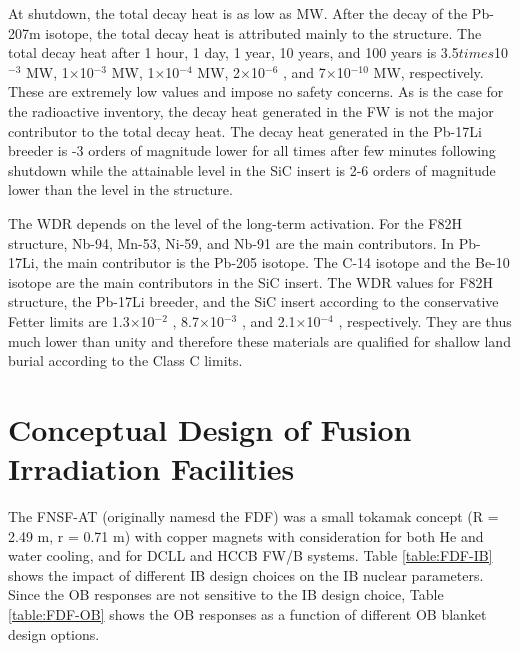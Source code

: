 At shutdown, the total decay heat is as low as  MW. After the
decay of the Pb-207m isotope, the total decay heat is attributed mainly to the
structure. The total decay heat after 1 hour, 1 day, 1 year, 10 years, and 100
years is 3.5$times$10$^{-3}$ MW, 1$\times$10$^{-3}$ MW, 1$\times$10$^{-4}$ MW,
2$\times$10$^{-6}$ , and 7$\times$10$^{-10}$ MW, respectively. These are
extremely low values and impose no safety concerns. As is the case for the
radioactive inventory, the decay heat generated in the \gls{FW} is not the
major contributor to the total decay heat. The decay heat generated in the
Pb-17Li breeder is -3 orders of magnitude lower for all times
after few minutes following shutdown while the attainable level in the SiC
insert is 2-6 orders of magnitude lower than the level in the structure.

The \gls{WDR} depends on the level of the long-term activation. For the F82H
structure, Nb-94, Mn-53, Ni-59, and Nb-91 are the main contributors. In Pb-
17Li, the main contributor is the Pb-205 isotope. The C-14 isotope and the
Be-10 isotope are the main contributors in the SiC insert. The \gls{WDR}
values for F82H structure, the Pb-17Li breeder, and the SiC insert according
to the conservative Fetter limits are 1.3$\times$10$^{-2}$ ,
8.7$\times$10$^{-3}$ , and 2.1$\times$10$^{-4}$ , respectively. They are thus
much lower than unity and therefore these materials are qualified for shallow
land burial according to the Class C limits.


\section{Conceptual Design of Fusion Irradiation Facilities}

The \gls{FNSF-AT} (originally namesd the \gls{FDF}) was a small tokamak
concept (R = 2.49 m, r = 0.71 m) with copper magnets with consideration for
both He and water cooling, and for \gls{DCLL} and \gls{HCCB} \gls{FW/B}
systems.  Table \ref{table:FDF-IB} shows the impact of different \gls{IB}
design choices on the \gls{IB} nuclear parameters.  Since the \gls{OB}
responses are not sensitive to the \gls{IB} design choice, Table
\ref{table:FDF-OB} shows the \gls{OB} responses as a function of different
\gls{OB} blanket design options.

